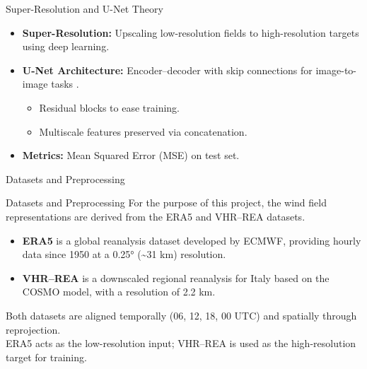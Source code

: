 \documentclass[footline=authortitle]{beamer}
\begin{document}
\begin{frame}{Super-Resolution and U-Net Theory}
  \begin{itemize}
    \item \textbf{Super-Resolution:} Upscaling low-resolution fields to high-resolution targets using deep learning. %
    \vspace{0.5cm}
    \item \textbf{U-Net Architecture:} Encoder–decoder with skip connections for image-to-image tasks \cite{ronneberger2015u}.
      \begin{itemize}
        \item Residual blocks to ease training.
        \item Multiscale features preserved via concatenation.
      \end{itemize}
      \vspace{0.5cm}
    \item \textbf{Metrics:} Mean Squared Error (MSE) on test set.
  \end{itemize}
\end{frame}

\begin{frame}{Datasets and Preprocessing}
\end{frame}

\begin{frame}{Datasets and Preprocessing}
    For the purpose of this project, the wind field representations are derived from the ERA5 and VHR--REA datasets.
    \vspace{1em}
        \begin{itemize}
            \item \textbf{ERA5} is a global reanalysis dataset developed by ECMWF, providing hourly data since 1950 at a 0.25° (\textasciitilde31 km) resolution.
            \item \textbf{VHR--REA} is a downscaled regional reanalysis for Italy based on the COSMO model, with a resolution of 2.2 km.
        \end{itemize}
    \vspace{1em}
    Both datasets are aligned temporally (06, 12, 18, 00 UTC) and spatially through reprojection. \\
    \vspace{1em}
    ERA5 acts as the low-resolution input; VHR--REA is used as the high-resolution target for training.
\end{frame}
\end{document}
